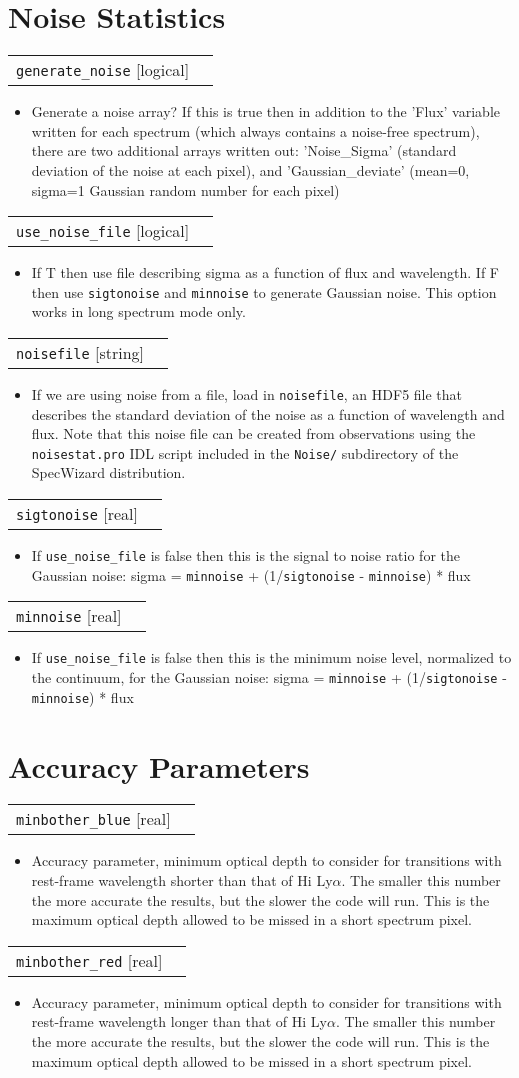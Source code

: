 \documentclass{report}
\makeatletter
\newcommand{\paramdefinition}[3]{
\begin{tabular*}{\textwidth}{l@{\extracolsep{\fill}}r}
		{\tt #1} [{\sc #2}]& #3 \\
\end{tabular*}}
\newcommand{\paramdescription}[1]{
\begin{itemize}
\item #1
\end{itemize}\vspace{0.2cm}}
\makeatother
\begin{document}
\section{Noise Statistics}
\paramdefinition{generate\_noise}{logical}{}
\paramdescription{Generate a noise array?  If this is true then in addition to the 'Flux' variable written for each spectrum (which always contains a noise-free spectrum), there are two additional arrays written out: 'Noise\_Sigma' (standard deviation of the noise at each pixel), and 'Gaussian\_deviate' (mean=0, sigma=1 Gaussian random number for each pixel)}

\paramdefinition{use\_noise\_file}{logical}{}
\paramdescription{If T then use file describing sigma as a function of flux and wavelength.  If F then use {\tt sigtonoise} and {\tt minnoise} to generate Gaussian noise.  This option works in long spectrum mode only.}

\paramdefinition{noisefile}{string}{}
\paramdescription{If we are using noise from a file, load in {\tt noisefile}, an HDF5 file that describes the standard deviation of the noise as a function of wavelength and flux.  Note that this noise file can be created from observations using the {\tt noisestat.pro} IDL script included in the {\tt Noise/} subdirectory of the SpecWizard distribution.}

\paramdefinition{sigtonoise}{real}{}
\paramdescription{If {\tt use\_noise\_file} is false then this is the signal to noise ratio for the Gaussian noise: sigma = {\tt minnoise} + (1/{\tt sigtonoise} - {\tt minnoise}) * flux}

\paramdefinition{minnoise}{real}{}
\paramdescription{If {\tt use\_noise\_file} is false then this is the minimum noise level, normalized to the continuum, for the Gaussian noise: sigma = {\tt minnoise} + (1/{\tt sigtonoise} - {\tt minnoise}) * flux}

\section{Accuracy Parameters}

\paramdefinition{minbother\_blue}{real}{}
\paramdescription{Accuracy parameter, minimum optical depth to consider for transitions with rest-frame wavelength shorter than that of H{\sc i} Ly$\alpha$.  The smaller this number the more accurate the results, but the slower the code will run. This is the maximum optical depth allowed to be missed in a short spectrum pixel.}

\paramdefinition{minbother\_red}{real}{}
\paramdescription{Accuracy parameter, minimum optical depth to consider for transitions with rest-frame wavelength longer than that of H{\sc i} Ly$\alpha$.  The smaller this number the more accurate the results, but the slower the code will run. This is the maximum optical depth allowed to be missed in a short spectrum pixel.}
\end{document}
